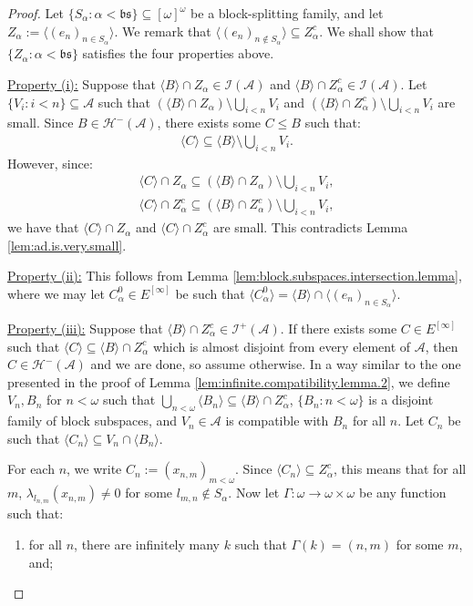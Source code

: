 \documentclass[11pt,reqno]{amsart}
\theoremstyle{plain}
\numberwithin{equation}{section}
\theoremstyle{definition}
\renewcommand{\c}[1]{\langle #1 \rangle}
\newcommand{\cal}{\mathcal}
\renewcommand{\frak}{\mathfrak}
\newcommand{\A}{\cal{A}}
\renewcommand{\H}{\cal{H}}
\newcommand{\I}{\cal{I}}
\begin{document}
\begin{proof}
    Let $\{S_\alpha : \alpha < \frak{bs}\} \subseteq [\omega]^\omega$ be a block-splitting family, and let $Z_\alpha := \c{(e_n)_{n \in S_\alpha}}$. We remark that $\c{(e_n)_{n \notin S_\alpha}} \subseteq Z_\alpha^c$. We shall show that $\{Z_\alpha : \alpha < \frak{bs}\}$ satisfies the four properties above. 

    \underline{Property (i):} Suppose that $\c{B} \cap Z_\alpha \in \I(\A)$ and $\c{B} \cap Z_\alpha^c \in \I(\A)$. Let $\{V_i : i < n\} \subseteq \A$ such that $(\c{B} \cap Z_\alpha) \setminus \bigcup_{i<n} V_i$ and $(\c{B} \cap Z_\alpha^c) \setminus \bigcup_{i<n} V_i$ are small. Since $B \in \H^-(\A)$, there exists some $C \leq B$ such that:
    \begin{align*}
        \c{C} \subseteq \c{B} \setminus \bigcup_{i<n} V_i.
    \end{align*}
    However, since:
    \begin{align*}
        \c{C} \cap Z_\alpha \subseteq (\c{B} \cap Z_\alpha) \setminus \bigcup_{i<n} V_i, \\        
        \c{C} \cap Z_\alpha^c \subseteq (\c{B} \cap Z_\alpha^c) \setminus \bigcup_{i<n} V_i,
    \end{align*}
    we have that $\c{C} \cap Z_\alpha$ and $\c{C} \cap Z_\alpha^c$ are small. This contradicts Lemma \ref{lem:ad.is.very.small}.

    \underline{Property (ii):} This follows from Lemma \ref{lem:block.subspaces.intersection.lemma}, where we may let $C_\alpha^0 \in E^{[\infty]}$ be such that $\c{C_\alpha^0} = \c{B} \cap \c{(e_n)_{n \in S_\alpha}}$.
    
    \underline{Property (iii):} Suppose that $\c{B} \cap Z_\alpha^c \in \I^+(\A)$. If there exists some $C \in E^{[\infty]}$ such that $\c{C} \subseteq \c{B} \cap Z_\alpha^c$ which is almost disjoint from every element of $\A$, then $C \in \H^-(\A)$ and we are done, so assume otherwise. In a way similar to the one presented in the proof of Lemma \ref{lem:infinite.compatibility.lemma.2}, we define $V_n,B_n$ for $n < \omega$ such that $\bigcup_{n<\omega} \c{B_n} \subseteq \c{B} \cap Z_\alpha^c$, $\{B_n : n < \omega\}$ is a disjoint family of block subspaces, and $V_n \in \A$ is compatible with $B_n$ for all $n$. Let $C_n$ be such that $\c{C_n} \subseteq V_n \cap \c{B_n}$. 
    
    For each $n$, we write $C_n := (x_{n,m})_{m<\omega}$. Since $\c{C_n} \subseteq Z_\alpha^c$, this means that for all $m$, $\lambda_{l_{n,m}}(x_{n,m}) \neq 0$ for some $l_{m,n} \notin S_\alpha$. Now let $\Gamma : \omega \to \omega \times \omega$ be any function such that:
    \begin{enumerate}
        \item for all $n$, there are infinitely many $k$ such that $\Gamma(k) = (n,m)$ for some $m$, and;


\end{enumerate}
\end{proof}
\end{document}

